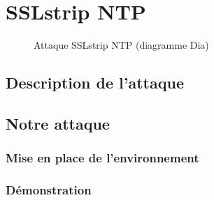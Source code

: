 \chapter{SSLstrip NTP}

\label{sec:sslstrip-ntp}

\begin{figure}[H]
  \caption{Attaque SSLstrip NTP (diagramme Dia)}
\end{figure}

\section{Description de l'attaque}

\section{Notre attaque}

\subsection{Mise en place de l'environnement}

\subsection{Démonstration}
